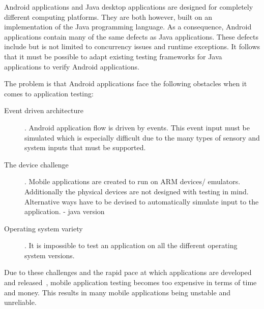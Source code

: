 \documentclass{acm_proc_article-sp}
\begin{document}



Android applications and Java desktop applications are designed for completely different computing platforms. They are both however, built on an implementation of the 
Java programming language. As a consequence, Android applications contain many of the same defects as Java applications. These defects include but is not limited to concurrency
issues and runtime exceptions. It follows that it must be possible to adapt existing testing frameworks for Java applications to verify Android applications.

The problem is that Android applications face the following obstacles when it comes to application testing:
\begin{description}
 \item [Event driven architecture]. Android application flow is driven by events. This event input must be simulated which is especially difficult due to the many types of
sensory and system inputs that must be supported. 

 \item [The device challenge]. 
 Mobile applications are created to run on ARM devices/ emulators. Additionally the physical devices are
not designed with testing in mind. Alternative ways have to be devised to automatically simulate input to the application.
- java version


 \item [Operating system variety]. It is impossible to test an application on all the different operating system versions.
\end{description}

Due to these challenges and the rapid pace at which applications are developed and released~\cite{}, mobile application testing becomes too expensive in
terms of time and money. This results in many mobile applications being unstable and unreliable.
\end{document}
